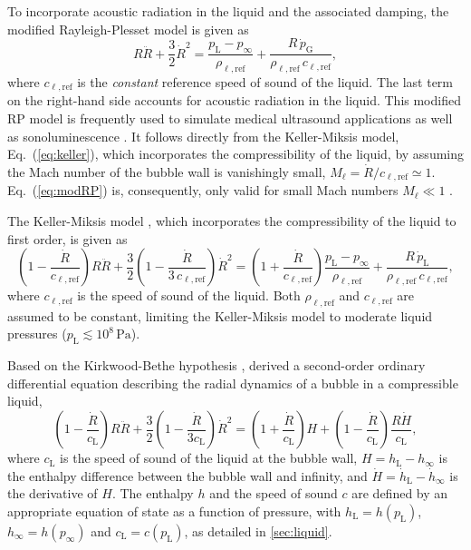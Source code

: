 To incorporate acoustic radiation in the liquid and the associated damping, the modified Rayleigh-Plesset model is given as \citep{Brenner2002}
\begin{equation}
R \ddot{R} + \frac{3}{2} \dot{R}^2 = \frac{p_\text{L} - p_\infty}{\rho_{\ell,\mathrm{ref}}} + \frac{R \, \dot{p}_\text{G}}{\rho_{\ell,\mathrm{ref}} \, c_{\ell,\mathrm{ref}}} ,
\label{eq:modRP}
\end{equation}
where $c_{\ell,\mathrm{ref}}$ is the \textit{constant} reference speed of sound of the liquid. The last term on the right-hand side accounts for acoustic radiation in the liquid.
This modified RP model is frequently used to simulate medical ultrasound applications \citep{Versluis2020} as well as sonoluminescence \citep{Brenner2002}.
It follows directly from the Keller-Miksis model, Eq.~(\ref{eq:keller}), which incorporates the compressibility of the liquid, by assuming the Mach number of the bubble wall is vanishingly small, $M_\ell = \dot{R}/c_{\ell,\mathrm{ref}} \simeq 1$. Eq.~(\ref{eq:modRP}) is, consequently, only valid for small Mach numbers $M_\ell \ll 1$ \citep{Neppiras1980, Prosperetti1986}.

The Keller-Miksis model \citep{Keller1980, Prosperetti1986}, which incorporates the compressibility of the liquid to first order, is given as
\begin{equation}
\left(1 - \frac{\dot{R}}{c_{\ell,\mathrm{ref}}}\right) R \ddot{R} + \frac{3}{2} \left(1 - \frac{\dot{R}}{3\, c_{\ell,\mathrm{ref}}}\right) \dot{R}^2 =  \left(1 + \frac{\dot{R}}{c_{\ell,\mathrm{ref}}}\right) \frac{p_\text{L} - p_\infty}{\rho_{\ell,\mathrm{ref}}} + \frac{R \, \dot{p}_\text{L}}{\rho_{\ell,\mathrm{ref}} \, c_{\ell,\mathrm{ref}}} ,
\label{eq:keller}
\end{equation}
where $c_{\ell,\mathrm{ref}}$ is the speed of sound of the liquid. Both $\rho_{\ell,\mathrm{ref}}$ and $c_{\ell,\mathrm{ref}}$ are assumed to be constant, limiting the Keller-Miksis model to moderate liquid pressures ($p_\mathrm{L} \lesssim 10^8 \, \mathrm{Pa}$).

Based on the Kirkwood-Bethe hypothesis \citep{Kirkwood1942,Cole1948}, \citet{Gilmore1952} derived a second-order ordinary differential equation describing the radial dynamics of a bubble in a compressible liquid, %
\begin{equation}
  \left( 1 - \frac{\dot{R}}{c_\text{L}} \right) R \ddot{R} + \frac{3}{2} \left( 1 - \frac{\dot{R}}{3 c_\text{L}} \right) \dot{R}^2  = \left( 1 + \frac{\dot{R}}{c_\text{L}} \right) H + \left( 1- \frac{\dot{R}}{c_\text{L}} \right) \frac{R \dot{H}}{c_\text{L}}, \label{eq:gilmore}
\end{equation} 
where $c_\mathrm{L}$ is the speed of sound of the liquid at the bubble wall, $H = h_\text{L} - h_\infty$ is the enthalpy difference between the bubble wall and infinity, and $\dot{H} = \dot{h}_\text{L} - \dot{h}_\infty$ is the derivative of $H$. The enthalpy $h$ and the speed of sound $c$ are defined by an appropriate equation of state as a function of pressure, with $h_\text{L} = h(p_\text{L})$, $h_\infty = h(p_\infty)$ and $c_\text{L} = c(p_\text{L})$, as detailed in \ref{sec:liquid}.

